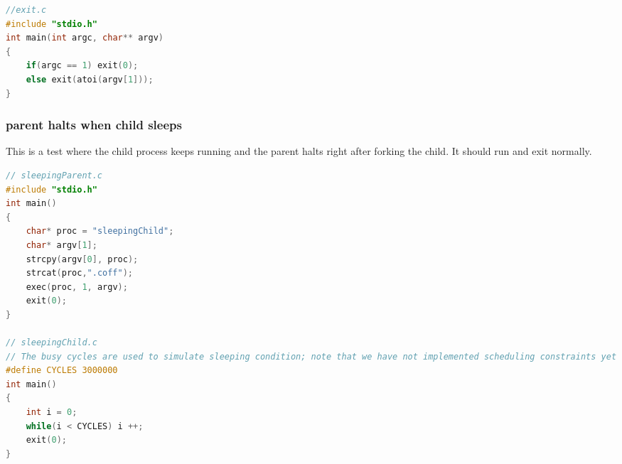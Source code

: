 \documentclass{article}
\begin{document}
\begin{spacing}{1.1}
\begin{lstlisting}[language=C]
//exit.c
#include "stdio.h"
int main(int argc, char** argv)
{
    if(argc == 1) exit(0);
    else exit(atoi(argv[1]));
}
\end{lstlisting}

\subsubsection{parent halts when child sleeps}
This is a test where the child process keeps running and the parent halts right after forking the child. It should run and exit normally.
\begin{lstlisting}[language=C]
// sleepingParent.c
#include "stdio.h"
int main()
{
    char* proc = "sleepingChild";
    char* argv[1];
    strcpy(argv[0], proc);
    strcat(proc,".coff");
    exec(proc, 1, argv);
    exit(0);
}

// sleepingChild.c
// The busy cycles are used to simulate sleeping condition; note that we have not implemented scheduling constraints yet
#define CYCLES 3000000
int main()
{
    int i = 0;
    while(i < CYCLES) i ++;
    exit(0);
}
\end{lstlisting}


\end{spacing}
\end{document}
